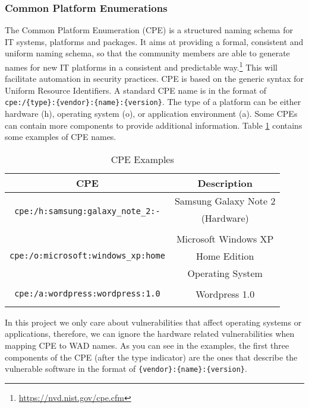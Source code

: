 \subsubsection{Common Platform Enumerations}
The Common Platform Enumeration (CPE) is a structured naming schema for IT systems, platforms and packages. It aims at providing a formal, consistent and uniform naming schema, so that the community members are able to generate names for new IT platforms in a consistent and predictable way.\footnote{\url{https://nvd.nist.gov/cpe.cfm}} This will facilitate automation in security practices. CPE is based on the generic syntax for Uniform Resource Identifiers. A standard CPE name is in the format of \texttt{cpe:/\{type\}:\{vendor\}:\{name\}:\{version\}}. The type of a platform can be either hardware (h), operating system (o), or application environment (a). Some CPEs can contain more components to provide additional information. Table \ref{table:sample_cpes} contains some examples of CPE names. 
\begin{table}
\begin{center}
    \begin{tabular}{ | c | c | }
    
    \hline
	 \hhline{|*2-}
	\rowcolor{LightBlue}   
    \textbf{CPE} & \textbf{Description}  
    \\ \hline
    \multirow{3}{*}{\texttt{cpe:/h:samsung:galaxy\_note\_2:-}} & Samsung Galaxy Note 2 \\ & (Hardware) \\ & 
        \\ \hline
   \multirow{3}{*}{\texttt{cpe:/o:microsoft:windows\_xp:home}} & Microsoft Windows XP \\ & Home Edition \\ & Operating System
        \\ \hline
         \multirow{3}{*}{\texttt{cpe:/a:wordpress:wordpress:1.0}} &  \\ & Wordpress 1.0 \\ & 
        \\ \hline
    \end{tabular}
    \caption{CPE Examples}
    \label{table:sample_cpes}
   \end{center}
    
\end{table}

In this project we only care about vulnerabilities that affect operating systems or applications, therefore, we can ignore the hardware related vulnerabilities when mapping CPE to WAD names. As you can see in the examples, the first three components of the CPE (after the type indicator) are the ones that describe the vulnerable software in the format of \texttt{\{vendor\}:\{name\}:\{version\}}.
 

